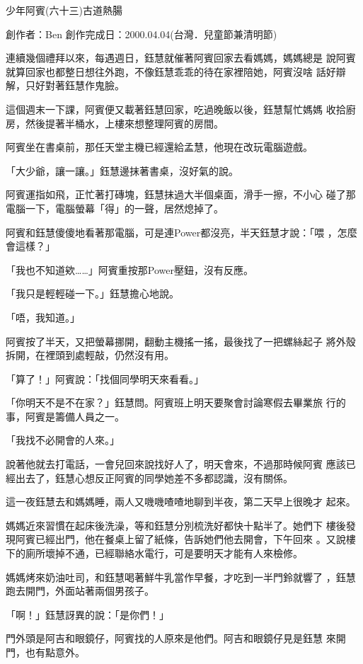 



少年阿賓(六十三)古道熱腸


創作者：Ben
創作完成日：2000.04.04(台灣．兒童節兼清明節)

連續幾個禮拜以來，每遇週日，鈺慧就催著阿賓回家去看媽媽，媽媽總是
說阿賓就算回家也都整日想往外跑，不像鈺慧乖乖的待在家裡陪她，阿賓沒啥
話好辯解，只好對著鈺慧作鬼臉。

這個週末一下課，阿賓便又載著鈺慧回家，吃過晚飯以後，鈺慧幫忙媽媽
收拾廚房，然後提著半桶水，上樓來想整理阿賓的房間。

阿賓坐在書桌前，那任天堂主機已經還給孟慧，他現在改玩電腦遊戲。

「大少爺，讓一讓。」鈺慧邊抹著書桌，沒好氣的說。

阿賓運指如飛，正忙著打磚塊，鈺慧抹過大半個桌面，滑手一擦，不小心
碰了那電腦一下，電腦螢幕「得」的一聲，居然熄掉了。

阿賓和鈺慧傻傻地看著那電腦，可是連Power都沒亮，半天鈺慧才說：「喂
，怎麼會這樣？」

「我也不知道欸……」阿賓重按那Power壓鈕，沒有反應。

「我只是輕輕碰一下。」鈺慧擔心地說。

「唔，我知道。」

阿賓按了半天，又把螢幕挪開，翻動主機搖一搖，最後找了一把螺絲起子
將外殼拆開，在裡頭到處輕敲，仍然沒有用。

「算了！」阿賓說：「找個同學明天來看看。」

「你明天不是不在家？」鈺慧問。阿賓班上明天要聚會討論寒假去畢業旅
行的事，阿賓是籌備人員之一。

「我找不必開會的人來。」

說著他就去打電話，一會兒回來說找好人了，明天會來，不過那時候阿賓
應該已經出去了，鈺慧心想反正阿賓的同學她差不多都認識，沒有關係。

這一夜鈺慧去和媽媽睡，兩人又嘰嘰喳喳地聊到半夜，第二天早上很晚才
起來。

媽媽近來習慣在起床後洗澡，等和鈺慧分別梳洗好都快十點半了。她們下
樓後發現阿賓已經出門，他在餐桌上留了紙條，告訴她們他去開會，下午回來
。又說樓下的廁所壞掉不通，已經聯絡水電行，可是要明天才能有人來檢修。

媽媽烤來奶油吐司，和鈺慧喝著鮮牛乳當作早餐，才吃到一半門鈴就響了
，鈺慧跑去開門，外面站著兩個男孩子。

「啊！」鈺慧訝異的說：「是你們！」

門外頭是阿吉和眼鏡仔，阿賓找的人原來是他們。阿吉和眼鏡仔見是鈺慧
來開門，也有點意外。

